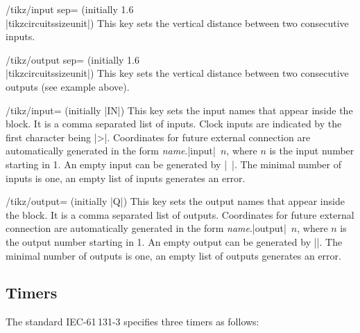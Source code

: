 \documentclass[a4paper]{ltxdoc}
\begin{document}
\begin{key}{/tikz/input sep= (initially 1.6\\|tikzcircuitssizeunit|)}
This key sets the vertical distance between two consecutive inputs.
\begin{codeexample}[width=5.3cm]
\end{codeexample}
\end{key}

\begin{key}{/tikz/output sep= (initially 1.6\\|tikzcircuitssizeunit|)}
This key sets the vertical distance between two consecutive outputs (see example above).
\end{key}

\begin{key}{/tikz/input= (initially |{IN}|)}
This key sets the input names that appear inside the block. It is a comma separated list of inputs. Clock inputs are indicated by the first character being |>|. Coordinates for future external connection are automatically generated in the form \emph{name}.|input|~$n$, where $n$ is the input number starting in 1. An empty input can be generated by |{~}|. The minimal number of inputs is one, an empty list of inputs generates an error.
\end{key}

\begin{key}{/tikz/output= (initially |{Q}|)}
This key sets the output names that appear inside the block. It is a comma separated list of outputs. Coordinates for future external connection are automatically generated in the form \emph{name}.|output|~$n$, where $n$ is the output number starting in 1. An empty output can be generated by |{}|. The minimal number of outputs is one, an empty list of outputs generates an error.
\end{key}
 

\subsection{Timers}
The standard IEC-61\,131-3 specifies three timers as follows:
\end{document}

